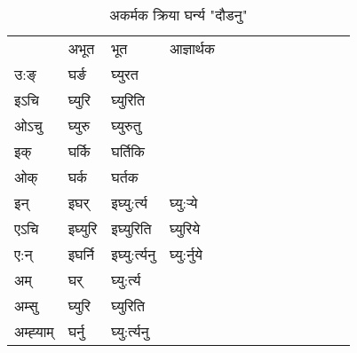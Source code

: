 \begin{table}[H]
\label{ur.vi} \centering
\caption{अकर्मक क्रिया  घर्न्य  "दौडनु"  }
\begin{tabular}{l|l|l|l|l|l|l|l|l|l|l|l|l}  \toprule
&अभूत & भूत & आज्ञार्थक \\ 
उ:ङ्‌ &घर्ङ &घ्युरत \\ 
इऽचि &घ्युरि &घ्युरिति   \\ 
ओऽचु &घ्युरु &घ्युरुतु   \\ 
इक् &घर्कि &घर्तिकि   \\ 
ओक् &घर्क &घर्तक   \\ 
इन् & इघर् & इघ्यु:र्त्य &घ्यु:र्‍ये  \\ 
एऽचि & इघ्युरि & इघ्युरिति &घ्युरिये    \\ 
ए:न् & इघर्नि  & इघ्यु:र्त्यनु &घ्यु:र्नुये  \\ 
अम् & घर् & घ्यु:र्त्य   \\ 
अम्सु & घ्युरि & घ्युरिति   \\ 
अम्ह्‍याम् & घर्नु  & घ्यु:र्त्यनु \\ 
\bottomrule
\end{tabular}
\end{table}


